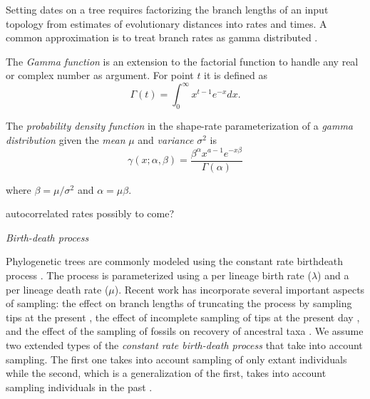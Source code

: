 \documentclass{llncs}
\newcommand{\ejmcomment}[1]{{\color{green} #1}}
\renewcommand{\subsection}[1]{%
\bigskip
\begin{center}
\begin{large}
\normalfont\itshape #1
\end{large}
\end{center}}
\begin{document}
Setting dates on a tree requires factorizing the branch lengths of an input topology
from estimates of evolutionary distances into rates and times. 
A common approximation is to treat branch rates as gamma distributed \citep{Kishino2001}.

The {\em Gamma function} is an extension to the factorial function to handle
any real or complex number as argument. For point $t$ it is defined as
$$\Gamma(t) = \int_0^\infty x^{t-1} e^{-x} dx.$$

The {\em probability density function} in the shape-rate parameterization of a
{\em gamma distribution} given the {\em mean} $\mu$ and {\em variance} $\sigma^2$ 
is
$$ \gamma(x;\alpha,\beta) = \frac{\beta^{\alpha}x^{a-1}e^{-x\beta}}{\Gamma(\alpha)} $$

where $\beta = \mu / \sigma^2$ and $\alpha = \mu \beta$.

\ejmcomment{autocorrelated rates possibly to come?}

\subsection{Birth-death process}
Phylogenetic trees are commonly modeled using the constant rate birth\textendash death process \citep{Kendall1948}.
The process is parameterized using a per lineage birth rate ($\lambda$) and a per lineage death rate ($\mu$).
Recent work has incorporate several important aspects of sampling:
the effect on branch lengths of truncating the process by sampling tips at the present \citep{Gernhard2008},
the effect of incomplete sampling of tips at the present day \citep{Stadler2009}, and the effect of the sampling
of fossils on recovery of ancestral taxa \citep{Stadler2010}.
We assume two extended types of the {\em constant rate birth-death process}
that take into account sampling. The
first one takes into account sampling of only extant individuals
\citep{Stadler2009} while the second, which is a generalization of the first,
takes into account sampling individuals in the past \citep{Stadler2010}.
\end{document}

